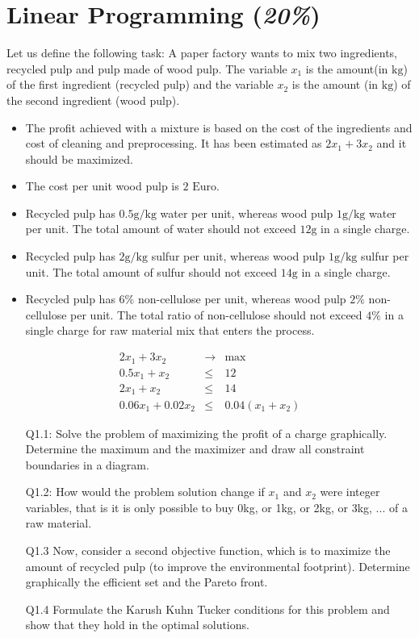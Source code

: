 \documentclass{article}
\newcommand{\mrm}[1]{\mathrm{#1}}
\begin{document}
	\section{Linear Programming (\textit{20\%})}
	Let us define the following task:
	A paper factory wants to mix two ingredients, recycled pulp and pulp made of wood pulp.
	The variable $x_1$ is the amount(in $\mathrm{kg}$) of the first ingredient (recycled pulp) and the variable $x_2$ is the amount (in $\mathrm{kg}$) of the second ingredient (wood pulp).
	\begin{itemize}
	\item The profit achieved with a mixture is based on the cost of the ingredients and cost of cleaning and preprocessing. It has been estimated as $2 x_1 + 3 x_2$ and it should be maximized. 
	\item The cost per unit wood pulp is $2$ $ \mrm{Euro}$. 
	\item Recycled pulp has $0.5\mrm{g}/\mathrm{kg}$ water per unit, whereas wood pulp $1\mathrm{g}/\mrm{kg}$ water per unit. The total amount of water should not exceed $12 \mathrm{g}$ in a single charge.
	\item Recycled pulp has $2 \mathrm{g}/\mrm{kg}$ sulfur per unit, whereas wood pulp $1 \mathrm{g}/\mrm{kg}$ sulfur per unit. The total amount of sulfur should not exceed $14 \mrm{g}$ in a single charge.
	\item Recycled pulp has $6\%$ non-cellulose per unit, whereas wood pulp $2\%$ non-cellulose per unit. The total ratio of non-cellulose should not exceed $4\%$ in a single charge for raw material mix that enters the process.
    \end{itemize}
	\begin{eqnarray}
		2 x_1 + 3 x_2   &\rightarrow& \max\\
		0.5 x_1  +  x_2 &\leq& 12\\
		2 x_1 + x_2     &\leq& 14\\
		0.06 x_1 + 0.02 x_2   &\leq& 0.04(x_1 + x_2) 
	\end{eqnarray}
    \begin{itemize}
    	\item[Q1.1:]   Solve the problem of maximizing the profit of a charge graphically. Determine the maximum and the maximizer and draw all constraint boundaries in a diagram.
    	\item[Q1.2:] How would the problem solution change if $x_1$ and $x_2$ were integer variables, that is it is only possible to buy 0kg, or 1kg, or 2kg, or 3kg, $...$ of a raw material.
    	\item[Q1.3] Now, consider a second objective function, which is to maximize the amount of recycled pulp (to improve the environmental footprint). Determine graphically the efficient set and the Pareto front.
    	\item[Q1.4] Formulate the Karush Kuhn Tucker conditions for this problem and show that they hold in the optimal solutions.
    \end{itemize}
\end{document}
